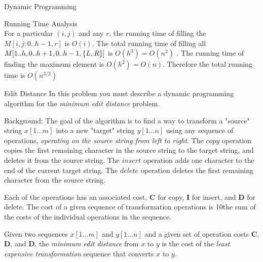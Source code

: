 \documentclass{article}
\numberwithin{table}{section}
\numberwithin{figure}{section}
\begin{document}
\begin{section}{Dynamic Programming}
\begin{enumerate}
\begin{tcolorbox}[breakable]
\begin{enumerate}
\begin{minipage}{\linewidth}
            \item Running Time Analysis\\
                For a particular $(i,j)$ and any $r$, the running time of filling the $M[i,j : 0..h-1, r]$ is $O(i)$. The total running time of filling all $M[1..h, 0..h+1, 0..h-1, \left\{L,R\right\}]$ is $O(h^3) = O(n^2)$ . The running time of finding the maximum element is $O(h^2) = O(n)$. Therefore the total running time is $O(n^{3/2})$ 
            \end{minipage}
        \end{enumerate}
    \end{tcolorbox}
\end{enumerate}
\end{section}

\newpage
\begin{section}{Edit Distance}
In this problem you must describe a dynamic programming algorithm for the \emph{minimum edit distance} problem.

Background: The goal of the algorithm is to find a way to transform a "source" string $x[1 \dots m]$ into a new "target" string $y[1 \dots n]$ using any sequence of operations, \emph{operating on the source string from left to right}. The
$copy$ operation copies the first remaining character in the source string to the target string, and deletes it from the source string. The $insert$ operation adds one character to the end of the current target string. The $delete$ operation deletes the first remaining character from the source string.

Each of the operations has an associated cost, $\mathbf{C}$ for copy, $\mathbf{I}$ for insert, and $\mathbf{D}$ for delete. The cost of a given sequence of transformation operations is 10the sum of the costs of the individual operations in the sequence.

Given two sequences $x[1 \dots m]$ and $y[1 \dots n]$ and a given set of operation costs $\mathbf{C}$, $\mathbf{D}$, and $\mathbf{D}$, the \emph{minimum edit distance} from $x$ to $y$ is the cost of the \emph{least expensive transformation} sequence that converts $x$ to $y$.


\end{section}
\end{document}
